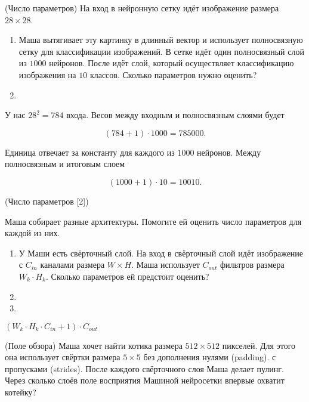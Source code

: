 \begin{problem}{(Число параметров)}
На вход в нейронную сетку идёт изображение размера $28 \times 28$.

\begin{enumerate}
\item Маша вытягивает эту картинку в длинный вектор и использует полносвязную сетку для классификации изображений. В сетке идёт один полносвязный слой из $1000$ нейронов. После идёт слой, который осуществляет классификацию изображения на $10$ классов. Сколько параметров нужно оценить?

\item {}

\end{enumerate}
\end{problem}
\begin{sol}
У нас $28^2 = 784$ входа. Весов между входным и полносвязным слоями будет 

\[ (784 + 1)\cdot 1000 = 785000.\] 

Единица отвечает за константу для каждого из $1000$ нейронов. Между полносвязным и итоговым слоем

\[(1000 + 1) \cdot 10 = 10010. \]
\end{sol} 

\begin{problem}{(Число параметров [2])}

Маша собирает разные архитектуры. Помогите ей оценить число параметров для каждой из них. 

\begin{enumerate} 
    \item У Маши есть свёрточный слой. На вход в свёрточный слой идёт изображение с $C_{in}$ каналами размера $W \times H$. Маша использует $C_{out}$ фильтров размера $W_k \cdot H_k$. Сколько параметров ей предстоит оценить?
    
    \item 
    
    \item  {}
    
\end{enumerate} 
\end{problem}
\begin{sol}
$(W_k \cdot H_k \cdot C_{in} + 1) \cdot C_{out}$
\end{sol} 

\begin{problem}{(Поле обзора)}
    Маша хочет найти котика размера $512 \times 512$ пикселей. Для этого она использует свёртки размера $5 \times 5$ без дополнения нулями (padding).  с пропусками (strides). После каждого свёрточного слоя Маша делает пулинг. 
    Через сколько слоёв поле восприятия Машиной нейросетки впервые охватит котейку?
\end{problem}


